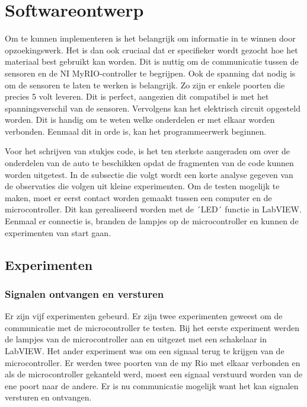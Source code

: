 \documentclass[a4paper,twoside,kulak]{kulakreport} %
\begin{document}
\section{Softwareontwerp}\label{Softwareontwerp}

Om te kunnen implementeren is het belangrijk om informatie in te winnen door opzoekingswerk. Het is dan ook cruciaal dat er specifieker wordt gezocht hoe het materiaal best gebruikt kan worden.
Dit is nuttig om de communicatie tussen de sensoren en de NI MyRIO-controller te begrijpen. Ook de spanning dat nodig is om de sensoren te laten te werken is belangrijk. Zo zijn er enkele poorten die precies 5 volt leveren. Dit is perfect, aangezien dit compatibel is met het spanningsverschil van de sensoren. Vervolgens kan het elektrisch circuit opgesteld worden. Dit is handig om te weten welke onderdelen er met elkaar worden verbonden. Eenmaal dit in orde is, kan het programmeerwerk beginnen.

Voor het schrijven van stukjes code, is het ten sterkste aangeraden om over de onderdelen van de auto te beschikken opdat de fragmenten van de code kunnen worden uitgetest. In de subsectie die volgt wordt een korte analyse gegeven van de observaties die volgen uit kleine experimenten. Om de testen mogelijk te maken, moet er eerst contact worden gemaakt tussen een computer en de microcontroller. Dit kan gerealiseerd worden met de ´LED´ functie in LabVIEW. Eenmaal er connectie is, branden de lampjes op de microcontroller en kunnen de experimenten van start gaan.


\subsection{Experimenten}
\subsubsection{Signalen ontvangen en versturen}
Er zijn vijf experimenten gebeurd. Er zijn twee experimenten geweest om de communicatie met de microcontroller te testen. 
Bij het eerste experiment werden de lampjes van de microcontroller aan en uitgezet met een schakelaar in LabVIEW.
Het ander experiment was om een signaal terug te krijgen van de microcontroller.
Er werden twee poorten van de my Rio met elkaar verbonden en als de microcontroller gekanteld werd, moest een signaal verstuurd worden van de ene poort naar de andere.
Er is nu communicatie mogelijk want het kan signalen versturen en ontvangen.
\end{document}
